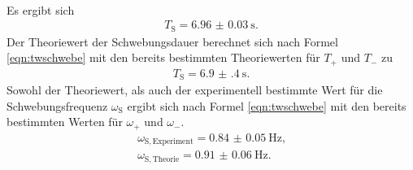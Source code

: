 \\Es ergibt sich
\begin{align*}
	T_{\mathrm{S}}=\SI{6.96(3)}{\second}\text{.}
\end{align*}
Der Theoriewert der Schwebungsdauer berechnet sich nach Formel \eqref{eqn:twschwebe} mit den bereits bestimmten Theoriewerten für $T_{\mathrm{+}}$ und $T_{\mathrm{-}}$ zu
\begin{align*}
	T_{\mathrm{S}}=\SI{6.9(4)}{\second}\text{.}
\end{align*}
Sowohl der Theoriewert, als auch der experimentell bestimmte Wert für die Schwebungsfrequenz $\omega_{\mathrm{S}}$ ergibt sich nach Formel \eqref{eqn:twschwebe} mit den bereits bestimmten Werten für $\omega_{\mathrm{+}}$ und $\omega_{\mathrm{-}}$.
\begin{align*}
	\omega_{\mathrm{S,Experiment}}=\SI{0.84(5)}{\Hz}\text{,} \\
	\omega_{\mathrm{S,Theorie}}=\SI{0.91(6)}{\Hz}\text{.}
\end{align*}
